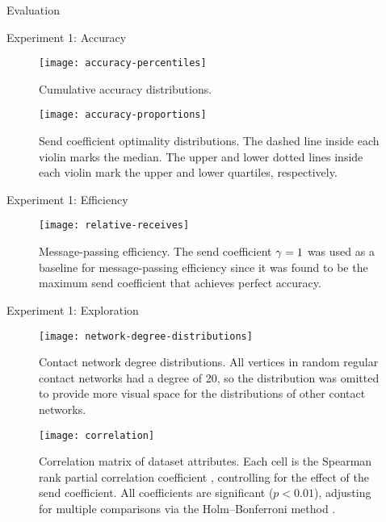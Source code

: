 \documentclass[11pt]{beamer}
\begin{document}
\begin{section}{Evaluation}

\begin{frame}[allowframebreaks]{Experiment 1: Accuracy}
\begin{figure}
  \centering
  \texttt{[image: accuracy-percentiles]}
  \caption[Cumulative accuracy distributions]{Cumulative accuracy distributions.}
\end{figure}

\begin{figure}
  \centering
  \texttt{[image: accuracy-proportions]}
  \caption[Send coefficient optimality distributions]{Send coefficient optimality distributions. The dashed line inside each violin marks the median. The upper and lower dotted lines inside each violin mark the upper and lower quartiles, respectively.}
\end{figure}
\end{frame}

\begin{frame}{Experiment 1: Efficiency}
\begin{figure}
  \centering
  \texttt{[image: relative-receives]}
  \caption[Message-passing efficiency]{Message-passing efficiency. The send coefficient $\gamma = 1$ was used as a baseline for message-passing efficiency since it was found to be the maximum send coefficient that achieves perfect accuracy.}
\end{figure}

\end{frame}

\begin{frame}[allowframebreaks]{Experiment 1: Exploration}
\begin{figure}
  \centering
  \texttt{[image: network-degree-distributions]}
  \caption[Contact network degree distributions]{Contact network degree distributions. All vertices in random regular contact networks had a degree of 20, so the distribution was omitted to provide more visual space for the distributions of other contact networks.}
\end{figure}

\begin{figure}
  \centering
  \texttt{[image: correlation]}
  \caption[Correlation matrix of dataset attributes]{Correlation matrix of dataset attributes. Each cell is the Spearman rank partial correlation coefficient \citep{Spearman1904}, controlling for the effect of the send coefficient. All coefficients are significant ($p < 0.01$), adjusting for multiple comparisons via the Holm–Bonferroni method \citep{Holm1979}.}
\end{figure}
\end{frame}


\end{section}
\end{document}
